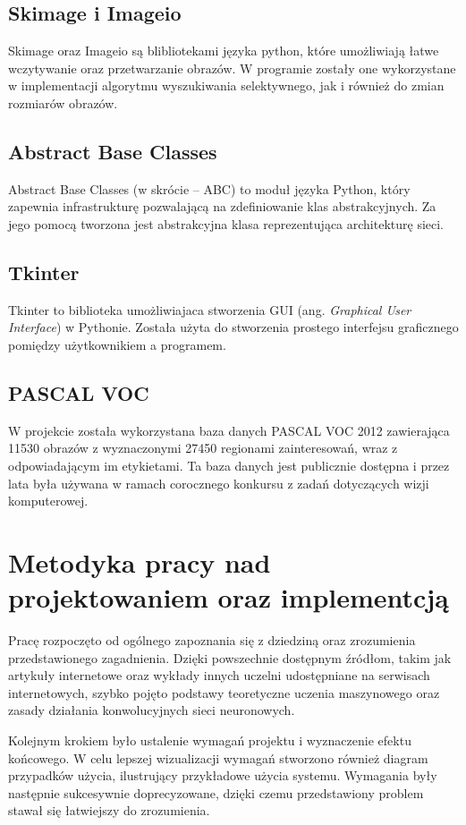 \documentclass[a4paper,twoside,12pt]{book}
\newcommand{\obcy}[1]{\emph{#1}}
\newcommand{\ang}[1]{{\selectlanguage{british}\obcy{#1}}}
\begin{document}
{\subsection{Skimage i Imageio}
{Skimage oraz Imageio są blibliotekami języka python, które umożliwiają łatwe wczytywanie oraz przetwarzanie obrazów. W programie zostały one wykorzystane w implementacji algorytmu wyszukiwania selektywnego, jak i również do zmian rozmiarów obrazów.}
\subsection{Abstract Base Classes}
\label{abc}
{Abstract Base Classes (w skrócie – ABC) to moduł języka Python, który zapewnia infrastrukturę pozwalającą na zdefiniowanie klas abstrakcyjnych. Za jego pomocą tworzona jest abstrakcyjna klasa reprezentująca architekturę sieci. }
\subsection{Tkinter}
{Tkinter to biblioteka umożliwiajaca stworzenia GUI (ang. \ang{Graphical User Interface}) w Pythonie. Została użyta do stworzenia prostego interfejsu graficznego pomiędzy użytkownikiem a programem.}
\subsection{PASCAL VOC}
{W projekcie została wykorzystana baza danych PASCAL VOC 2012\cite{PASCAL} zawierająca 11530 obrazów z wyznaczonymi 27450 regionami zainteresowań, wraz z odpowiadającym im etykietami. Ta baza danych jest publicznie dostępna i przez lata była używana w ramach corocznego konkursu z zadań dotyczących wizji komputerowej.
}

\section{Metodyka pracy nad projektowaniem oraz implementcją}
{Pracę rozpoczęto od ogólnego zapoznania się z dziedziną oraz zrozumienia przedstawionego zagadnienia. Dzięki powszechnie dostępnym źródłom, takim jak artykuły internetowe oraz wykłady innych uczelni udostępniane na serwisach internetowych, szybko pojęto podstawy teoretyczne uczenia maszynowego oraz zasady działania konwolucyjnych sieci neuronowych.}

{Kolejnym krokiem było ustalenie wymagań projektu i wyznaczenie efektu końcowego. W celu lepszej wizualizacji wymagań stworzono również diagram przypadków użycia, ilustrujący przykładowe użycia systemu. Wymagania były następnie sukcesywnie  doprecyzowane, dzięki czemu przedstawiony problem stawał się łatwiejszy do zrozumienia.}

}
\end{document}

